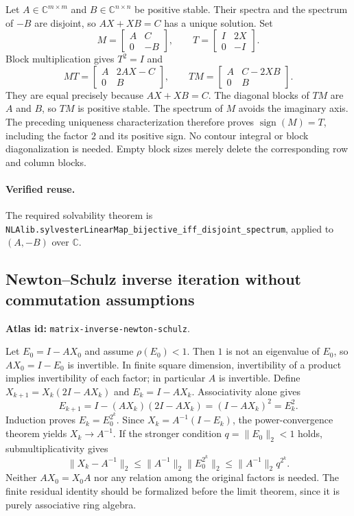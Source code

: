 \documentclass[11pt,a4paper]{article}
\newcommand{\C}{\mathbb C}
\DeclareRobustCommand{\code}[1]{{\footnotesize\urlstyle{tt}\nolinkurl{#1}}}
\begin{document}
Let $A\in\C^{m\times m}$ and $B\in\C^{n\times n}$ be positive
stable. Their spectra and the spectrum of $-B$ are disjoint, so
$AX+XB=C$ has a unique solution. Set
\[
 M=\begin{bmatrix}A&C\\0&-B\end{bmatrix},\qquad
 T=\begin{bmatrix}I&2X\\0&-I\end{bmatrix}.
\]
Block multiplication gives $T^2=I$ and
\[
 MT=\begin{bmatrix}A&2AX-C\\0&B\end{bmatrix},\qquad
 TM=\begin{bmatrix}A&C-2XB\\0&B\end{bmatrix}.
\]
They are equal precisely because $AX+XB=C$. The diagonal blocks of
$TM$ are $A$ and $B$, so $TM$ is positive stable. The spectrum of $M$
avoids the imaginary axis. The preceding uniqueness characterization
therefore proves $\operatorname{sign}(M)=T$, including the factor $2$
and its positive sign. No contour integral or block diagonalization
is needed. Empty block sizes merely delete the corresponding row and
column blocks.

\paragraph{Verified reuse.}
The required solvability theorem is
\code{NLAlib.sylvesterLinearMap_bijective_iff_disjoint_spectrum}, applied
to $(A,-B)$ over $\C$.

\subsection{Newton--Schulz inverse iteration without commutation assumptions}
\label{sec:eq-inverse-schulz}
\textbf{Atlas id:} \code{matrix-inverse-newton-schulz}.

Let $E_0=I-AX_0$ and assume $\rho(E_0)<1$. Then $1$ is not an
eigenvalue of $E_0$, so $AX_0=I-E_0$ is invertible. In finite square
dimension, invertibility of a product implies invertibility of each
factor; in particular $A$ is invertible. Define
$X_{k+1}=X_k(2I-AX_k)$ and $E_k=I-AX_k$. Associativity alone gives
\[
 E_{k+1}=I-(AX_k)(2I-AX_k)=(I-AX_k)^2=E_k^2.
\]
Induction proves $E_k=E_0^{2^k}$. Since
$X_k=A^{-1}(I-E_k)$, the power-convergence theorem yields
$X_k\to A^{-1}$. If the stronger condition $q=\|E_0\|_2<1$ holds,
submultiplicativity gives
\[
 \|X_k-A^{-1}\|_2
 \le\|A^{-1}\|_2\|E_0^{2^k}\|_2
 \le\|A^{-1}\|_2q^{2^k}.
\]
Neither $AX_0=X_0A$ nor any relation among the original factors is
needed. The finite residual identity should be formalized before the
limit theorem, since it is purely associative ring algebra.
\end{document}
